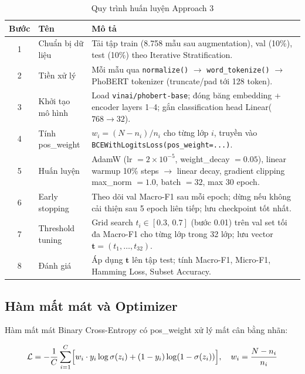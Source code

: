 \documentclass[12pt, a4paper]{report}
\begin{document}
\begin{table}[H]
\centering
\caption{Quy trình huấn luyện Approach 3}
\label{tab:training_workflow}
\begin{tabularx}{\linewidth}{clX}
\toprule
\textbf{Bước} & \textbf{Tên} & \textbf{Mô tả} \\
\midrule
1 & Chuẩn bị dữ liệu
  & Tải tập train (8.758 mẫu sau augmentation),
    val (10\%), test (10\%) theo Iterative Stratification. \\
2 & Tiền xử lý
  & Mỗi mẫu qua \texttt{normalize()} $\rightarrow$
    \texttt{word\_tokenize()} $\rightarrow$ PhoBERT tokenizer
    (truncate/pad tới 128 token). \\
3 & Khởi tạo mô hình
  & Load \texttt{vinai/phobert-base};
    đóng băng embedding + encoder layers 1--4;
    gắn classification head Linear($768 \rightarrow 32$). \\
4 & Tính pos\_weight
  & $w_i = (N - n_i) / n_i$ cho từng lớp $i$,
    truyền vào \texttt{BCEWithLogitsLoss(pos\_weight=...)}. \\
5 & Huấn luyện
  & AdamW (lr $= 2\!\times\!10^{-5}$, weight\_decay $= 0.05$),
    linear warmup 10\% steps $\rightarrow$ linear decay,
    gradient clipping max\_norm $= 1.0$,
    batch $= 32$, max 30 epoch. \\
6 & Early stopping
  & Theo dõi val Macro-F1 sau mỗi epoch;
    dừng nếu không cải thiện sau 5 epoch liên tiếp;
    lưu checkpoint tốt nhất. \\
7 & Threshold tuning
  & Grid search $t_i \in [0.3,\,0.7]$ (bước 0.01) trên val set
    tối đa Macro-F1 cho từng lớp trong 32 lớp;
    lưu vector $\mathbf{t} = (t_1,\ldots,t_{32})$. \\
8 & Đánh giá
  & Áp dụng $\mathbf{t}$ lên tập test;
    tính Macro-F1, Micro-F1, Hamming Loss, Subset Accuracy. \\
\bottomrule
\end{tabularx}
\end{table}

\subsection{Hàm mất mát và Optimizer}
\label{subsec:approach3_loss}

Hàm mất mát Binary Cross-Entropy có pos\_weight xử lý mất cân bằng nhãn:

\begin{equation}
  \mathcal{L} = -\frac{1}{C}\sum_{i=1}^{C}
  \Bigl[ w_i \cdot y_i \log\sigma(z_i)
       + (1 - y_i)\log(1-\sigma(z_i)) \Bigr],
  \quad w_i = \frac{N - n_i}{n_i}
\label{eq:bce_loss}
\end{equation}
\end{document}
